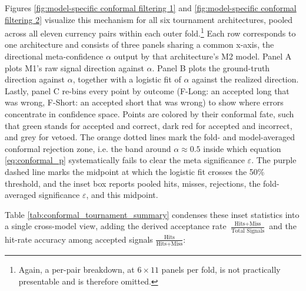 \documentclass[12pt, a4paper]{article}
\begin{document}
Figures \ref{fig:model-specific conformal filtering 1} and \ref{fig:model-specific conformal filtering 2} visualize this mechanism for all six tournament architectures, pooled across all eleven 
currency pairs within each outer fold.\footnote{Again, a per-pair breakdown, at $6 \times 11$ panels per fold, is not practically presentable and is therefore omitted.} 
Each row corresponds to one architecture and consists of three panels sharing a common x-axis, the directional meta-confidence $\alpha$ output by that architecture's M2 model. 
Panel A plots M1's raw signal direction against $\alpha$. Panel B plots the ground-truth direction against $\alpha$, together with a logistic fit of $\alpha$ 
against the realized direction. Lastly, panel C re-bins every point by outcome (F-Long: an accepted long that was wrong, F-Short: an accepted short that was wrong) to show 
where errors concentrate in confidence space. Points are colored by their conformal fate, such that green stands for accepted and correct, dark red for accepted and incorrect, and grey for vetoed. 
The orange dotted lines mark the fold- and model-averaged conformal rejection zone, i.e. the band around $\alpha \approx 0.5$ inside which equation \ref{eq:conformal_p} 
systematically fails to clear the meta significance $\varepsilon$. The purple dashed line marks the midpoint at which the logistic fit crosses the 50\% threshold, 
and the inset box reports pooled hits, misses, rejections, the fold-averaged significance $\varepsilon$, and this midpoint.

\medskip

Table \ref{tab:conformal_tournament_summary} condenses these inset statistics into a single cross-model view, adding the derived acceptance rate 
$\frac{\text{Hits}+\text{Miss}}{\text{Total Signals}}$ and the hit-rate accuracy among accepted signals $\frac{\text{Hits}}{\text{Hits}+\text{Miss}}$:
\end{document}
